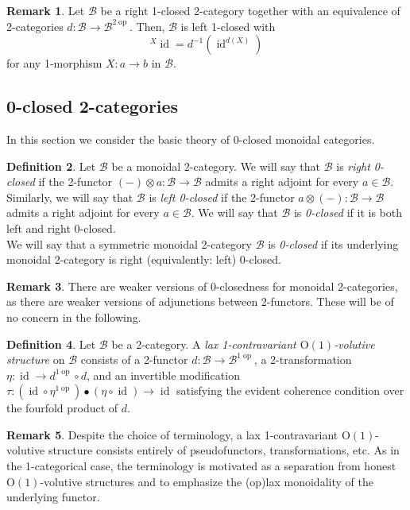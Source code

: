 \documentclass{article}
\newcommand{\opp}{\operatorname{op}}%
\newcommand{\id}{\operatorname{id}}%
\newcommand{\Oone}{\operatorname{O(1)}}
\newcommand{\B}{\mathcal{B}}
\numberwithin{equation}{section}
\theoremstyle{definition}
\newtheorem{definition}{Definition}[subsection]
\newtheorem{remark}[definition]{Remark}
\theoremstyle{theorem}
\begin{document}
\begin{remark}\label{Remark: right and left closedness for self-oneopposite 2-categories}
    Let $\B$ be a right 1-closed 2-category together with an equivalence of 2-categories $d \colon \B \to \B^{2\opp}$. 
    Then, $\B$ is left 1-closed with 
    \begin{equation}
        ^{X}\!\id = d^{-1}(\id^{d(X)})
    \end{equation}
    for any 1-morphism $X \colon a \to b$ in $\B$.
\end{remark}

\subsection{0-closed 2-categories}
In this section we consider the basic theory of 0-closed monoidal categories.
\begin{definition}
    Let $\B$ be a monoidal 2-category. We will say that $\B$ is \emph{right 0-closed} if the 2-functor $(-) \otimes a \colon \B \to \B$ admits a right adjoint 
    for every $a \in \B$. Similarly, we will say that $\B$ is \emph{left 0-closed} if the 2-functor $a \otimes (-) \colon \B \to \B$ admits a right adjoint 
    for every $a \in \B$. We will say that $\B$ is \emph{0-closed} if it is both left and right 0-closed.\\
    We will say that a symmetric monoidal 2-category $\B$ is \emph{0-closed} if its underlying monoidal 2-category is right (equivalently: left) 0-closed.
\end{definition}
\begin{remark}
    There are weaker versions of 0-closedness for monoidal 2-categories, as there are weaker versions of adjunctions between 2-functors. These will be of 
    no concern in the following.
\end{remark}
\begin{definition}
    Let $\B$ be a 2-category. A \emph{lax 1-contravariant $\Oone$-volutive structure} on $\B$ consists of a 2-functor $d \colon \B \to \B^{1\opp}$, a 
    2-transformation $\eta \colon \id \to d^{1\opp} \circ d$, and an invertible modification $\tau \colon (\id \circ \eta^{1\opp}) \bullet (\eta \circ \id) \to \id$
    satisfying the evident coherence condition over the fourfold product of $d$.
\end{definition}
\begin{remark}
    Despite the choice of terminology, a lax 1-contravariant $\Oone$-volutive structure consists entirely of pseudofunctors, transformations, etc. 
    As in the 1-categorical case, the terminology is motivated as a separation from honest $\Oone$-volutive structures and to emphasize the (op)lax monoidality of 
    the underlying functor.
\end{remark}
\end{document}

